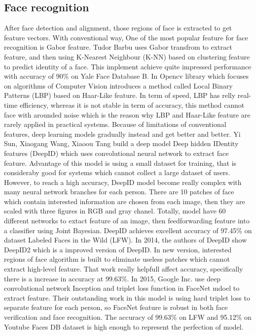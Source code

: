 \documentclass[journal, twocolumn]{IEEEtran}
\begin{document}
\subsection{Face recognition}
After face detection and alignment, those regions of face is extracted to get feature vectors. With conventional way, One of the most popular feature for face recognition is Gabor feature. Tudor Barbu \cite{ref:recog-1} uses Gabor transfrom to extract feature, and then using K-Nearest Neighbour (K-NN) based on clustering feature to predict identity of a face. This implement achieve quite impressed performance with accuracy of 90\% on Yale Face Database B. In Opencv library \cite{ref:recog-2} which focuses on algorithms of Computer Vision introduces a method called Local Binary Patterns (LBP) based on Haar-Like feature. In term of speed, LBP has relly real-time efficiency, whereas it is not stable in term of accuracy, this method cannot face with arounded noise which is the reason why LBP and Haar-Like feature are rarely applied in practical systems. Because of limitations of conventional features,  deep learning models gradually instead and get better and better. Yi Sun, Xiaogang Wang, Xiaoou Tang \cite{ref:recog-3} build a deep model Deep hidden IDentity features (DeepID) which uses convolutional neural network to extract face feature. Advantage of this model is using a small dataset for training, that is consideraby good for systems which cannot collect a large dataset of users. However, to reach a high accuracy, DeepID model become really complex with many neural network branches for each person. There are 10 patches of face which contain interested information are chosen from each image, then they are scaled with three figures in RGB and gray chanel. Totally, model have 60 different networks to extact feature of an image, then feedforwarding feature into a classifier using Joint Bayesian. DeepID achieves excellent accuracy of 97.45\% on dataset Labeled Faces in the
Wild (LFW). In 2014, the authors of DeepID show DeepID2 \cite{ref:recog-4} which is a improved version of DeepID. In new version, interested regions of face algorithm is built to eliminate useless patches which cannot extract high-level feature. That work really helpfull affect accuracy, specifically there is a increase in accuracy at 99.63\%. In 2015, Google Inc. \cite{ref:recog-5} use deep convolutional network Inception and triplet loss function in FaceNet mdoel to extract feature. Their outstanding work in this model is using hard triplet loss to separate feature for each person, so FaceNet feature is robust in both face verification and face recognition. The accuracy of 99.63\% on LFW and 95.12\% on Youtube Faces
DB dataset is high enough to represent the perfection of model.
\end{document}

